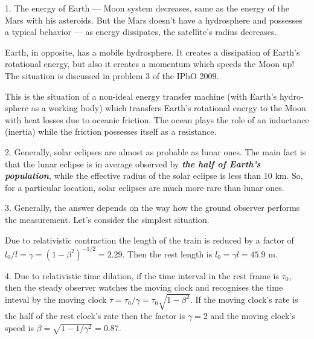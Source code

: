 \documentclass[14pt,a4paper,pdflatex]{disser}
\begin{document}
1. The energy of Earth --- Moon system decreases, same as the energy of the Mars with his asteroids. But the Mars doesn't have a hydrosphere and possesses a typical behavior --- as energy dissipates, the satellite's radius decreases.

Earth, in opposite, has a mobile hydrosphere. It creates a dissipation of Earth's rotational energy, but also it creates a momentum which speeds the Moon up! The situation is discussed in problem 3 of the IPhO 2009.

This is the situation of a non-ideal energy transfer machine (with Earth's hydro-\linebreak sphere as a working body) which transfers Earth's rotational energy to the Moon with heat losses due to oceanic friction. The ocean plays the role of an inductance (inertia) while the friction possesses itself as a resistance.

2. Generally, solar eclipses are almost as probable as lunar ones. The main fact is that the lunar eclipse is in average observed by \textit{\textbf{the half of Earth's population}}, while the effective radius of the solar eclipse is less than 10 km. So, for a particular location, solar eclipses are much more rare than lunar ones.

3. Generally, the answer depends on the way how the ground observer performs the measurement. Let's consider the simplest situation.

Due to relativistic contraction the length of the train is reduced by a factor of $l_0/l=\gamma=\left(1-\beta^2\right)^{-1/2}=2.29$. Then the rest length is $l_0=\gamma l=45.9$ m.

4. Due to relativistic time dilation, if the time interval in the rest frame is $\tau_0$, then the steady observer watches the moving clock and recognises the time inteval by the moving clock $\tau=\tau_0/\gamma=\tau_0\sqrt{1-\beta^2}$. If the moving clock's rate is the half of the rest clock's rate then the factor is $\gamma=2$ and the moving clock's speed is $\beta=\sqrt{1-1/\gamma^2}=0.87$.
\end{document}
